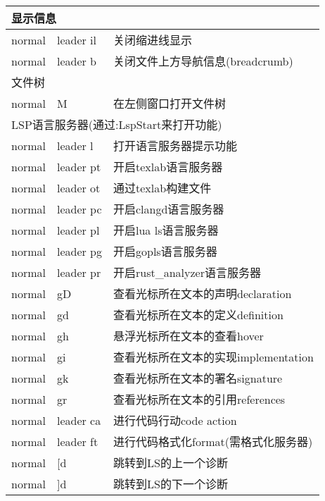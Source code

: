 \documentclass[11pt]{article}
\begin{document}
\begin{left}
  \begin{tabular}{|c|l|l|}
    \hline \multicolumn{3}{|l|}{显示信息} \\ \hline                
    normal & leader il & 关闭缩进线显示 \\
    normal & leader b & 关闭文件上方导航信息(breadcrumb) \\
    \hline \multicolumn{3}{|l|}{文件树} \\ \hline                
    normal & M & 在左侧窗口打开文件树 \\
    \hline \multicolumn{3}{|l|}{LSP语言服务器(通过:LspStart来打开功能)} \\ \hline                    
    normal & leader l & 打开语言服务器提示功能 \\        
    normal & leader pt & 开启texlab语言服务器 \\
    normal & leader ot & 通过texlab构建文件 \\    
    normal & leader pc & 开启clangd语言服务器 \\
    normal & leader pl & 开启lua ls语言服务器 \\
    normal & leader pg & 开启gopls语言服务器 \\
    normal & leader pr & 开启rust_analyzer语言服务器 \\
    normal & gD & 查看光标所在文本的声明declaration \\
    normal & gd & 查看光标所在文本的定义definition \\
    normal & gh & 悬浮光标所在文本的查看hover \\
    normal & gi & 查看光标所在文本的实现implementation \\
    normal & gk & 查看光标所在文本的署名signature \\
    normal & gr & 查看光标所在文本的引用references \\
    normal & leader ca & 进行代码行动code action \\
    normal & leader ft & 进行代码格式化format(需格式化服务器) \\
    normal & [d & 跳转到LS的上一个诊断 \\
    normal & ]d & 跳转到LS的下一个诊断 \\    
    \hline
  \end{tabular}  
\end{left}

\newpage{}
\end{document}
